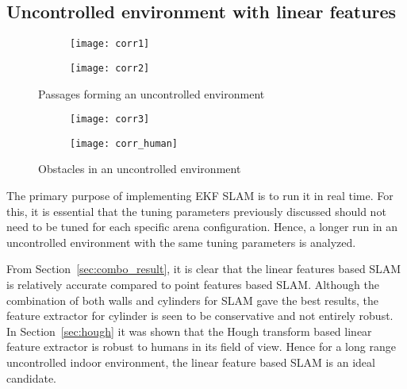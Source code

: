 \subsection{Uncontrolled environment with linear features}

\begin{figure}
    \centering
    \begin{subfigure}[b]{0.45\textwidth}
	    \texttt{[image: corr1]}
    \end{subfigure}
    \quad %
    \begin{subfigure}[b]{0.45\textwidth}
        \texttt{[image: corr2]}
    \end{subfigure}%

    \caption{Passages forming an uncontrolled environment}
    \label{fig:onboard_1}
\end{figure}

\begin{figure}
    \centering
    \begin{subfigure}[b]{0.45\textwidth}
	    \texttt{[image: corr3]}
    \end{subfigure}
    \quad %
    \begin{subfigure}[b]{0.45\textwidth}
        \texttt{[image: corr\_human]}
    \end{subfigure}%

    \caption{Obstacles in an uncontrolled environment}
    \label{fig:onboard_2}
\end{figure}
The primary purpose of implementing EKF SLAM is to run it in real time. For this, it is essential that the tuning parameters previously discussed should not need to be tuned for each specific arena configuration. Hence, a longer run in an uncontrolled environment  with the same tuning parameters is analyzed.

From Section~\ref{sec:combo_result}, it is clear that the linear features based SLAM is relatively accurate compared to point features based SLAM. Although the combination of both walls and cylinders for SLAM gave the best results, the feature extractor for cylinder is seen to be conservative and not entirely robust. In Section~\ref{sec:hough} it was shown that the Hough transform based linear feature extractor is robust to humans in its field of view. Hence for a long range uncontrolled indoor environment, the linear feature based SLAM is an ideal candidate. 

